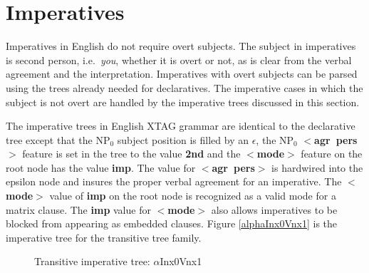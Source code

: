 \chapter{Imperatives}
\label{imperatives}

Imperatives in English do not require overt subjects.  The subject in
imperatives is second person, i.e.\ {\it you}, whether it is overt or
not, as is clear from the verbal agreement and the interpretation.
Imperatives with overt subjects can be  parsed using the trees already
needed for declaratives.  The imperative cases in which the subject is
not overt are handled by the imperative trees discussed in this section.

The imperative trees in English XTAG grammar are identical to the declarative
tree except that the NP$_{0}$ subject position is filled by an $\epsilon$, the
NP$_{0}$ {\bf $<$agr~pers$>$} feature is set in the tree to the value {\bf 2nd}
and the {\bf $<$mode$>$} feature on the root node has the value {\bf imp}.  The
value for {\bf $<$agr~pers$>$} is hardwired into the epsilon node and insures
the proper verbal agreement for an imperative.  The {\bf $<$mode$>$} value of
{\bf imp} on the root node is recognized as a valid mode for a matrix clause.
The {\bf imp} value for {\bf $<$mode$>$} also allows imperatives to be blocked
from appearing as embedded clauses.  Figure \ref{alphaInx0Vnx1} is the
imperative tree for the transitive tree family.

\begin{figure}[htbp]
\caption{Transitive imperative tree: $\alpha$Inx0Vnx1}
\label{alphaInx0Vnx1}
\label{2;11,1}
\end{figure}









